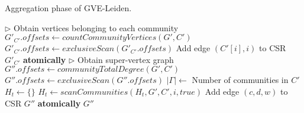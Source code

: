 \begin{algorithm}[hbtp]
\caption{Aggregation phase of GVE-Leiden.}
\label{alg:leidenag}
\begin{algorithmic}[1]

\Statex

  \State $\rhd$ Obtain vertices belonging to each community
  \State $G'_{C'}.offsets \gets countCommunityVertices(G', C')$ \label{alg:leidenag--coff-begin}
  \State $G'_{C'}.offsets \gets exclusiveScan(G'_{C'}.offsets)$ \label{alg:leidenag--coff-end}
   \label{alg:leidenag--comv-begin}
    \State Add edge $(C'[i], i)$ to CSR $G'_{C'}$ \textbf{atomically}
  \EndFor \label{alg:leidenag--comv-end}
  \State $\rhd$ Obtain super-vertex graph
  \State $G''.offsets \gets communityTotalDegree(G', C')$ \label{alg:leidenag--yoff-begin}
  \State $G''.offsets \gets exclusiveScan(G''.offsets)$ \label{alg:leidenag--yoff-end}
  \State $|\Gamma| \gets$ Number of communities in $C'$
  \ForAll{$c \in [0, |\Gamma|)$ \textbf{in parallel}} \label{alg:leidenag--y-begin}
    \State $H_t \gets \{\}$
      \State $H_t \gets scanCommunities(H_t, G', C', i, true)$
    \EndFor
      \State Add edge $(c, d, w)$ to CSR $G''$ \textbf{atomically}
    \EndFor
  \EndFor \label{alg:leidenag--y-end}
  \Return $G''$ \label{alg:leidenag--return}
\EndFunction
\end{algorithmic}
\end{algorithm}
